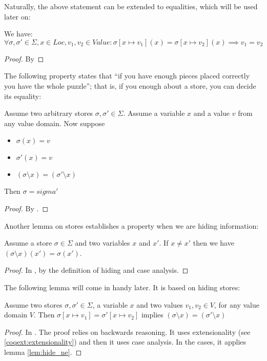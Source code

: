 Naturally, the above statement can be extended to equalities, which
will be used later on:
\begin{lem}
\label{lem:write-eq2}
  We have:
  \begin{equation*}
    \forall \sigma, \sigma' \in \Sigma, x \in Loc, v_1, v_2 \in Value
    \colon \sigma[x \mapsto v_1](x) = \sigma[x \mapsto v_2](x)
    \implies v_1 = v_2
  \end{equation*}
\end{lem}
\begin{proof}
  By \coq{}
\end{proof}

The following property states that ``if you have enough pieces placed
correctly you have the whole puzzle''; that is, if you enough about a
store, you can decide its equality:
\begin{lem}
\label{lem:hide-eq}
  Assume two arbitrary stores $\sigma, \sigma' \in \Sigma$. Assume a
  variable $x$ and a value $v$ from any value domain. Now suppose
  \begin{itemize}
  \item $\sigma(x) = v$
  \item $\sigma'(x) = v$
  \item $(\sigma \setminus x) = (\sigma' \setminus x)$
  \end{itemize}
  Then $\sigma = sigma'$
\end{lem}
\begin{proof}
  By \coq{}.
\end{proof}

Another lemma on stores establishes a property when we are hiding
information:
\begin{lem}
\label{lem:hide_ne}
  Assume a store $\sigma \in \Sigma$ and two variables $x$ and
  $x'$. If $x \neq x'$ then we have $(\sigma \setminus x)(x') = \sigma(x')$.
\end{lem}
\begin{proof}
  In \coq{}, by the definition of hiding and case analysis.
\end{proof}

The following lemma will come in handy later. It is based on hiding
stores:
\begin{lem}
\label{lem:write_hide}
  Assume two stores $\sigma, \sigma' \in \Sigma$, a variable $x$ and
  two values $v_1, v_2 \in V$, for any value domain $V$. Then
  $\sigma[x \mapsto v_1] = \sigma'[x \mapsto v_2]$ implies $(\sigma
  \setminus x) = (\sigma' \setminus x)$
\end{lem}
\begin{proof}
  In \coq{}. The proof relies on backwards reasoning. It uses
  extensionality (see \ref{coqext:extensionality}) and then it uses
  case analysis. In the cases, it applies lemma \eqref{lem:hide_ne}.
\end{proof}

